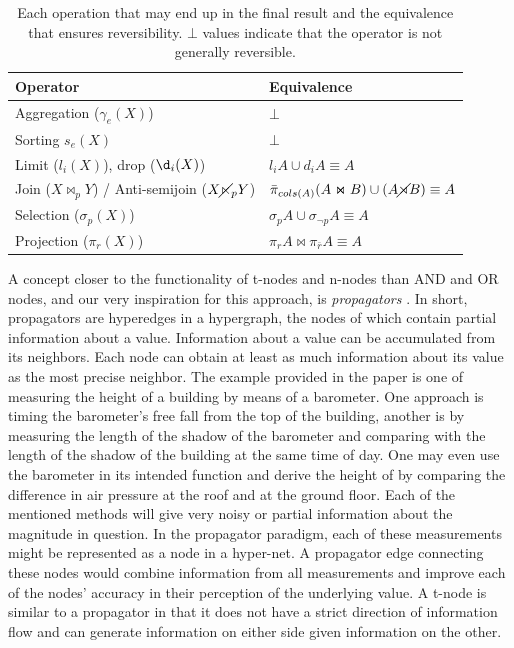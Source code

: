 \begin{table}[H]
  \centering
  \begin{tabular}{ll}
    Operator & Equivalence\\
    \hline
    Aggregation (\(\gamma_e(X)\)) & \(\bot\) \\
    Sorting \(s_e(X)\) & \(\bot\) \\
    Limit (\(l_i(X)\)), drop (\(\d_i(X)\)) & \(l_i A \cup d_i A \equiv A\) \\
    Join (\(X \Join_p Y\)) / Anti-semijoin (\(X \cancel\ltimes_p Y\)) & \( \bar{\pi}_{cols(A)}(A \Join B) \cup (A \cancel\rtimes B) \equiv A\)  \\
    Selection (\(\sigma_p(X)\)) & \(\sigma_p A \cup \sigma_{\neg p} A \equiv A\) \\
    Projection (\(\pi_r(X)\)) & \(\pi_r A \Join \pi_{\bar{r}} A \equiv A\) \\
  \end{tabular}
  \caption{\label{tab:reverse_corresp}Each operation that may end up
    in the final result and the equivalence that ensures
    reversibility. \(\bot\) values indicate that the operator is not
    generally reversible.}

\end{table}

A concept closer to the functionality of t-nodes and n-nodes than AND
and OR nodes, and our very inspiration for this approach, is
\emph{propagators} \cite{radulPropagationNetworksFlexible2009a}. In
short, propagators are hyperedges in a hypergraph, the nodes of which
contain partial information about a value. Information about a value
can be accumulated from its neighbors. Each node can obtain at least
as much information about its value as the most precise neighbor. The
example provided in the paper is one of measuring the height of a
building by means of a barometer. One approach is timing the
barometer's free fall from the top of the building, another is by
measuring the length of the shadow of the barometer and comparing with
the length of the shadow of the building at the same time of day. One
may even use the barometer in its intended function and derive the
height of by comparing the difference in air pressure at the roof and
at the ground floor. Each of the mentioned methods will give very
noisy or partial information about the magnitude in question. In the
propagator paradigm, each of these measurements might be represented
as a node in a hyper-net. A propagator edge connecting these nodes
would combine information from all measurements and improve each of
the nodes' accuracy in their perception of the underlying value. A
t-node is similar to a propagator in that it does not have a strict
direction of information flow and can generate information on either
side given information on the other.

